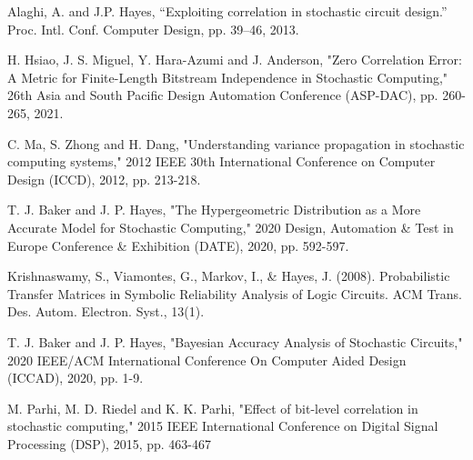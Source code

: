 \documentclass[conference]{IEEEtran}
\begin{document}
\begin{thebibliography}{1}

Alaghi, A. and J.P. Hayes, “Exploiting correlation in stochastic circuit design.” Proc. Intl. Conf. Computer Design, pp. 39–46, 2013.

H. Hsiao, J. S. Miguel, Y. Hara-Azumi and J. Anderson, "Zero Correlation Error: A Metric for Finite-Length Bitstream Independence in Stochastic Computing," 26th Asia and South Pacific Design Automation Conference (ASP-DAC), pp. 260-265, 2021.

C. Ma, S. Zhong and H. Dang, "Understanding variance propagation in stochastic computing systems," 2012 IEEE 30th International Conference on Computer Design (ICCD), 2012, pp. 213-218.

T. J. Baker and J. P. Hayes, "The Hypergeometric Distribution as a More Accurate Model for Stochastic Computing," 2020 Design, Automation \& Test in Europe Conference \& Exhibition (DATE), 2020, pp. 592-597.

Krishnaswamy, S., Viamontes, G., Markov, I., \& Hayes, J. (2008). Probabilistic Transfer Matrices in Symbolic Reliability Analysis of Logic Circuits. ACM Trans. Des. Autom. Electron. Syst., 13(1).

T. J. Baker and J. P. Hayes, "Bayesian Accuracy Analysis of Stochastic Circuits," 2020 IEEE/ACM International Conference On Computer Aided Design (ICCAD), 2020, pp. 1-9.

M. Parhi, M. D. Riedel and K. K. Parhi, "Effect of bit-level correlation in stochastic computing," 2015 IEEE International Conference on Digital Signal Processing (DSP), 2015, pp. 463-467

\end{thebibliography}
\end{document}
